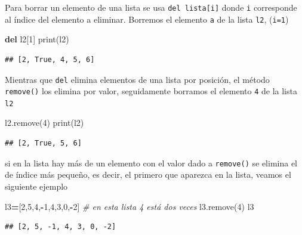 \documentclass[
]{book}
\newenvironment{Shaded}{\begin{snugshade}}{\end{snugshade}}
\newcommand{\BuiltInTok}[1]{#1}
\newcommand{\CommentTok}[1]{\textcolor[rgb]{0.56,0.35,0.01}{\textit{#1}}}
\newcommand{\DecValTok}[1]{\textcolor[rgb]{0.00,0.00,0.81}{#1}}
\newcommand{\KeywordTok}[1]{\textcolor[rgb]{0.13,0.29,0.53}{\textbf{#1}}}
\newcommand{\NormalTok}[1]{#1}
\newcommand{\OperatorTok}[1]{\textcolor[rgb]{0.81,0.36,0.00}{\textbf{#1}}}
\theoremstyle{definition}
\theoremstyle{definition}
\theoremstyle{definition}
\theoremstyle{definition}
\theoremstyle{remark}
\begin{document}
Para borrar un elemento de una lista se usa \texttt{del\ lista{[}i{]}} donde \texttt{i} corresponde al índice del elemento a eliminar. Borremos el elemento \texttt{\textquotesingle{}a\textquotesingle{}} de la lista \texttt{l2}, (\texttt{i=1})

\begin{Shaded}
\begin{Highlighting}[]
\KeywordTok{del}\NormalTok{ l2[}\DecValTok{1}\NormalTok{]  }
\BuiltInTok{print}\NormalTok{(l2)}
\end{Highlighting}
\end{Shaded}

\begin{verbatim}
## [2, True, 4, 5, 6]
\end{verbatim}

Mientras que \texttt{del} elimina elementos de una lista por posición, el método \texttt{remove()} los elimina por valor, seguidamente borramos el elemento \texttt{4} de la lista \texttt{l2}

\begin{Shaded}
\begin{Highlighting}[]
\NormalTok{l2.remove(}\DecValTok{4}\NormalTok{)  }
\BuiltInTok{print}\NormalTok{(l2)}
\end{Highlighting}
\end{Shaded}

\begin{verbatim}
## [2, True, 5, 6]
\end{verbatim}

si en la lista hay más de un elemento con el valor dado a \texttt{remove()} se elimina el de índice más pequeño, es decir, el primero que aparezca en la lista, veamos el siguiente ejemplo

\begin{Shaded}
\begin{Highlighting}[]
\NormalTok{l3}\OperatorTok{=}\NormalTok{[}\DecValTok{2}\NormalTok{,}\DecValTok{5}\NormalTok{,}\DecValTok{4}\NormalTok{,}\OperatorTok{{-}}\DecValTok{1}\NormalTok{,}\DecValTok{4}\NormalTok{,}\DecValTok{3}\NormalTok{,}\DecValTok{0}\NormalTok{,}\OperatorTok{{-}}\DecValTok{2}\NormalTok{] }\CommentTok{\# en esta lista 4 está dos veces}
\NormalTok{l3.remove(}\DecValTok{4}\NormalTok{)}
\NormalTok{l3}
\end{Highlighting}
\end{Shaded}

\begin{verbatim}
## [2, 5, -1, 4, 3, 0, -2]
\end{verbatim}
\end{document}
